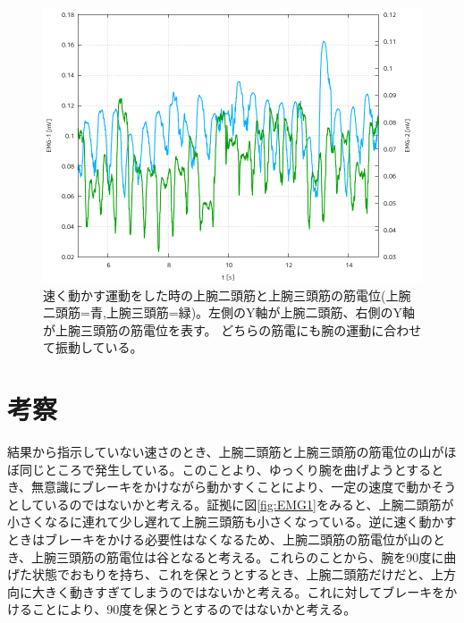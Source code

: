 \documentclass{jsarticle}
\begin{document}
\begin{figure}[h]
  \begin{center}
    \includegraphics[clip,width=120mm]{Graph_5.png}
    \caption{速く動かす運動をした時の上腕二頭筋と上腕三頭筋の筋電位(上腕二頭筋=青,上腕三頭筋=緑)。左側のY軸が上腕二頭筋、右側のY軸が上腕三頭筋の筋電位を表す。 どちらの筋電にも腕の運動に合わせて振動している。\label{fig:EMG2}}
  \end{center}  
\end{figure}

\section{考察}
結果から指示していない速さのとき、上腕二頭筋と上腕三頭筋の筋電位の山がほぼ同じところで発生している。このことより、ゆっくり腕を曲げようとするとき、無意識にブレーキをかけながら動かすくことにより、一定の速度で動かそうとしているのではないかと考える。証拠に図\ref{fig:EMG1}をみると、上腕二頭筋が小さくなるに連れて少し遅れて上腕三頭筋も小さくなっている。逆に速く動かすときはブレーキをかける必要性はなくなるため、上腕二頭筋の筋電位が山のとき、上腕三頭筋の筋電位は谷となると考える。これらのことから、腕を90度に曲げた状態でおもりを持ち、これを保とうとするとき、上腕二頭筋だけだと、上方向に大きく動きすぎてしまうのではないかと考える。これに対してブレーキをかけることにより、90度を保とうとするのではないかと考える。
\end{document}
